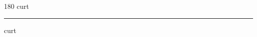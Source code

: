 
\begin{frame}
\begin{center}
\begin{turn}{180}
{\fontsize{2.5cm}{1em}\selectfont curt}
\end{turn}
\vspace{1em}\par  
\hrule
\vspace{1em}\par  
{\fontsize{2.5cm}{1em}\selectfont curt}
\end{center}
\end{frame}

